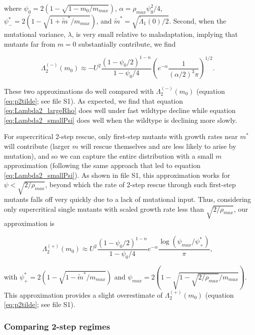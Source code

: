 \documentclass[9pt,twocolumn,twoside,lineno]{gsajnl}
\begin{document}
\noindent where $\psi_0 = 2(1-\sqrt{1-m_0/m_{max}})$, $\alpha = \rho_{max} \psi_0^2/4$, $\psi^*_{-} = 2(1-\sqrt{1 + \tilde{m}^*/m_{max}})$, and $\tilde{m}^* = \sqrt{\tilde{\Lambda}_1(0)/2}$.
Second, when the mutational variance, $\lambda$, is very small relative to maladaptation, implying that mutants far from $m=0$ substantially contribute, we find

\begin{equation}\label{eq:Lambda2_largeRho}
\Lambda_2^{(-)}(m_0) \approx -U^2 \frac{(1-\psi_0/2)^{1-n}}{1-\psi_0/4} \left(  e^{-\alpha} \frac{1}{(\alpha/2)^3 \pi} \right)^{1/2}.
\end{equation}

\noindent These two approximations do well compared with $\Lambda_2^{(-)}(m_0)$ (equation \ref{eq:p2tilde}; see file S1). 
As expected, we find that equation \ref{eq:Lambda2_largeRho} does well under fast wildtype decline while equation \ref{eq:Lambda2_smallPsi} does well when the wildtype is declining more slowly. 

For supercritical 2-step rescue, only first-step mutants with growth rates near $m^*$ will contribute (larger $m$ will rescue themselves and are less likely to arise by mutation), and so we can capture the entire distribution with a small $m$ approximation (following the same approach that led to equation \ref{eq:Lambda2_smallPsi}).
As shown in file S1, this approximation works for $\psi<\sqrt{2/\rho_{max}}$, beyond which the rate of 2-step rescue through such first-step mutants falls off very quickly due to a lack of mutational input.
Thus, considering only supercritical single mutants with scaled growth rate less than $\sqrt{2/\rho_{max}}$, our approximation is

\begin{equation}\label{eq:Lambda2_smallPsi_Super}
\Lambda_2^{(+)}(m_0) \approx U^2 \frac{(1-\psi_0/2)^{1-n}}{1-\psi_0/4} e^{-\alpha} \frac{\log(\psi_{max} / \psi^*_{+})}{\pi},
\end{equation}

\noindent with $\psi^*_{+} = 2(1-\sqrt{1 - \tilde{m}^*/m_{max}})$ and $\psi_{max} = 2(1-\sqrt{1 - \sqrt{2/\rho_{max}}/m_{max}})$.
This approximation provides a slight overestimate of $\Lambda_2^{(+)}(m_0)$ (equation \ref{eq:p2tilde}; see file S1).

\subsubsection{Comparing 2-step regimes}
\end{document}
